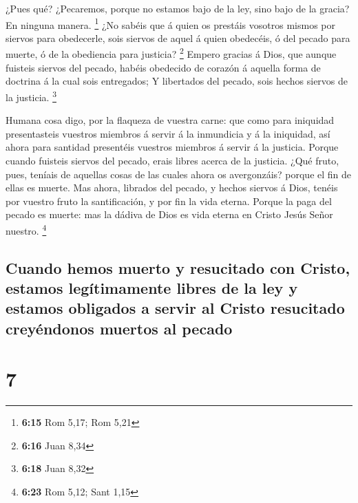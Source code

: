  ¿Pues qué? ¿Pecaremos, porque no estamos bajo de la ley,
sino bajo de la gracia? En ninguna manera. \footnote{\textbf{6:15} Rom
  5,17; Rom 5,21}  ¿No sabéis que á quien os prestáis
vosotros mismos por siervos para obedecerle, sois siervos de aquel á
quien obedecéis, ó del pecado para muerte, ó de la obediencia para
justicia? \footnote{\textbf{6:16} Juan 8,34}  Empero
gracias á Dios, que aunque fuisteis siervos del pecado, habéis obedecido
de corazón á aquella forma de doctrina á la cual sois entregados;
 Y libertados del pecado, sois hechos siervos de la
justicia. \footnote{\textbf{6:18} Juan 8,32}

 Humana cosa digo, por la flaqueza de vuestra carne: que
como para iniquidad presentasteis vuestros miembros á servir á la
inmundicia y á la iniquidad, así ahora para santidad presentéis vuestros
miembros á servir á la justicia.  Porque cuando fuisteis
siervos del pecado, erais libres acerca de la justicia. 
¿Qué fruto, pues, teníais de aquellas cosas de las cuales ahora os
avergonzáis? porque el fin de ellas es muerte.  Mas
ahora, librados del pecado, y hechos siervos á Dios, tenéis por vuestro
fruto la santificación, y por fin la vida eterna.  Porque
la paga del pecado es muerte: mas la dádiva de Dios es vida eterna en
Cristo Jesús Señor nuestro. \footnote{\textbf{6:23} Rom 5,12; Sant 1,15}

\hypertarget{cuando-hemos-muerto-y-resucitado-con-cristo-estamos-leguxedtimamente-libres-de-la-ley-y-estamos-obligados-a-servir-al-cristo-resucitado-creyuxe9ndonos-muertos-al-pecado}{%
\subsection{Cuando hemos muerto y resucitado con Cristo, estamos
legítimamente libres de la ley y estamos obligados a servir al Cristo
resucitado creyéndonos muertos al
pecado}\label{cuando-hemos-muerto-y-resucitado-con-cristo-estamos-leguxedtimamente-libres-de-la-ley-y-estamos-obligados-a-servir-al-cristo-resucitado-creyuxe9ndonos-muertos-al-pecado}}

\hypertarget{section-6}{%
\section{7}\label{section-6}}

